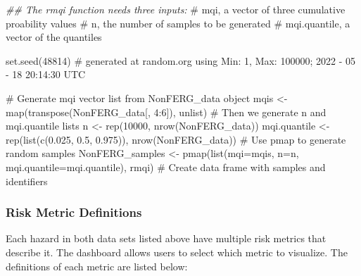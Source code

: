 \documentclass[
  letterpaper,
  DIV=11,
  numbers=noendperiod]{scrartcl}
\newenvironment{Shaded}{\begin{snugshade}}{\end{snugshade}}
\newcommand{\AttributeTok}[1]{\textcolor[rgb]{0.40,0.45,0.13}{#1}}
\newcommand{\CommentTok}[1]{\textcolor[rgb]{0.37,0.37,0.37}{#1}}
\newcommand{\DecValTok}[1]{\textcolor[rgb]{0.68,0.00,0.00}{#1}}
\newcommand{\DocumentationTok}[1]{\textcolor[rgb]{0.37,0.37,0.37}{\textit{#1}}}
\newcommand{\FloatTok}[1]{\textcolor[rgb]{0.68,0.00,0.00}{#1}}
\newcommand{\FunctionTok}[1]{\textcolor[rgb]{0.28,0.35,0.67}{#1}}
\newcommand{\NormalTok}[1]{\textcolor[rgb]{0.00,0.23,0.31}{#1}}
\newcommand{\OtherTok}[1]{\textcolor[rgb]{0.00,0.23,0.31}{#1}}
\newcommand{\SpecialCharTok}[1]{\textcolor[rgb]{0.37,0.37,0.37}{#1}}
\begin{document}
\begin{Shaded}
\begin{Highlighting}[]
\DocumentationTok{\#\# The rmqi function needs three inputs: }
  \CommentTok{\# mqi, a vector of three cumulative proability values}
  \CommentTok{\# n, the number of samples to be generated}
  \CommentTok{\# mqi.quantile, a vector of the quantiles}

\FunctionTok{set.seed}\NormalTok{(}\DecValTok{48814}\NormalTok{) }\CommentTok{\# generated at random.org using Min: 1,  Max: 100000; 2022 {-} 05 {-} 18 20:14:30 UTC}

\CommentTok{\# Generate mqi vector list from NonFERG\_data object}
\NormalTok{mqis }\OtherTok{\textless{}{-}} \FunctionTok{map}\NormalTok{(}\FunctionTok{transpose}\NormalTok{(NonFERG\_data[, }\DecValTok{4}\SpecialCharTok{:}\DecValTok{6}\NormalTok{]), unlist)}
\CommentTok{\# Then we generate n and mqi.quantile lists}
\NormalTok{n }\OtherTok{\textless{}{-}} \FunctionTok{rep}\NormalTok{(}\DecValTok{10000}\NormalTok{, }\FunctionTok{nrow}\NormalTok{(NonFERG\_data))}
\NormalTok{mqi.quantile }\OtherTok{\textless{}{-}} \FunctionTok{rep}\NormalTok{(}\FunctionTok{list}\NormalTok{(}\FunctionTok{c}\NormalTok{(}\FloatTok{0.025}\NormalTok{, }\FloatTok{0.5}\NormalTok{, }\FloatTok{0.975}\NormalTok{)), }\FunctionTok{nrow}\NormalTok{(NonFERG\_data))}
\CommentTok{\# Use pmap to generate random samples}
\NormalTok{NonFERG\_samples }\OtherTok{\textless{}{-}} \FunctionTok{pmap}\NormalTok{(}\FunctionTok{list}\NormalTok{(}\AttributeTok{mqi=}\NormalTok{mqis, }\AttributeTok{n=}\NormalTok{n, }\AttributeTok{mqi.quantile=}\NormalTok{mqi.quantile), rmqi)}
\CommentTok{\# Create data frame with samples and identifiers}
\end{Highlighting}
\end{Shaded}

\subsubsection{Risk Metric Definitions}\label{sec-metrics}

Each hazard in both data sets listed above have multiple risk metrics
that describe it. The dashboard allows users to select which metric to
visualize. The definitions of each metric are listed below:
\end{document}

